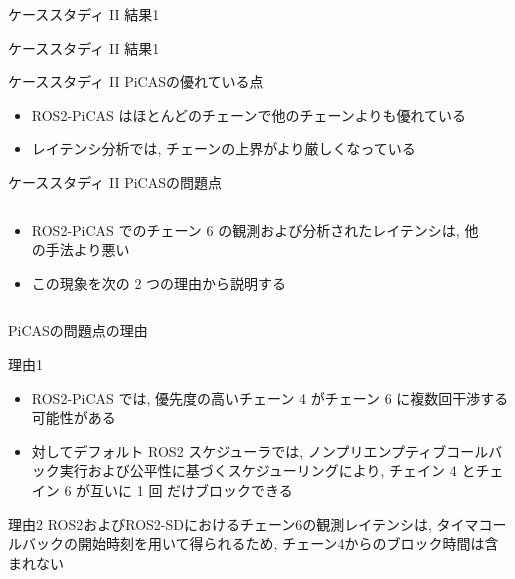 \begin{frame}{ケーススタディ II 結果1}
\end{frame}

\begin{frame}{ケーススタディ II 結果1}
\end{frame}

\begin{frame}{ケーススタディ II PiCASの優れている点}
    \begin{itemize}
        \item ROS2-PiCAS はほとんどのチェーンで他のチェーンよりも優れている
        \item レイテンシ分析では, チェーンの上界がより厳しくなっている
    \end{itemize}
\end{frame}

\begin{frame}{ケーススタディ II PiCASの問題点}
    \begin{columns}
    \begin{column}{0.8\textwidth}
        \begin{itemize}
            \item ROS2-PiCAS でのチェーン 6 の観測および分析されたレイテンシは, 他の手法より悪い
            \item この現象を次の 2 つの理由から説明する
        \end{itemize}
    \end{column}
    \begin{column}{0.2\textwidth}
    \end{column}
    \end{columns}
\end{frame}

\begin{frame}{PiCASの問題点の理由}
    \vspace{1mm}
    \begin{block}{理由1}
        \setlength{\linewidth}{0.98\columnwidth}
        \begin{itemize}
            \item ROS2-PiCAS では, 優先度の高いチェーン 4 がチェーン 6 に複数回干渉する可能性がある
        \item 対してデフォルト ROS2 スケジューラでは, ノンプリエンプティブコールバック実行および公平性に基づくスケジューリングにより, チェイン 4 とチェイン 6 が互いに 1 回 だけブロックできる
        \end{itemize}
    \end{block}
    \begin{block}{理由2}
        ROS2およびROS2-SDにおけるチェーン6の観測レイテンシは, タイマコールバックの開始時刻を用いて得られるため, チェーン4からのブロック時間は含まれない
    \end{block}
\end{frame}

